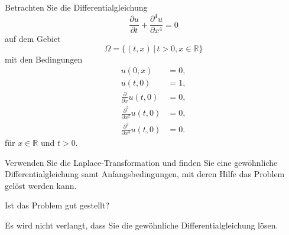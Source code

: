 Betrachten Sie die Differentialgleichung
\begin{equation}
\frac{\partial u}{\partial t}
+
\frac{\partial^4 u}{\partial x^4}
=
0
\end{equation}
auf dem Gebiet
\[
\Omega = \{ (t,x)\,|\, t>0, x\in\mathbb R\}
\]
mit den Bedingungen
\begin{align*}
u(0,x) &= 0,\\
u(t,0) &= 1,\\
\frac{\partial}{\partial x}u(t,0) &=0,\\
\frac{\partial^2}{\partial x^2}u(t,0) &=0,\\
\frac{\partial^3}{\partial x^3}u(t,0) &=0.
\end{align*}
für $x\in\mathbb R$ und $t > 0$.
\begin{teilaufgaben}
\item
Verwenden Sie die Laplace-Transformation und finden Sie eine gewöhnliche
Differentialgleichung samt Anfangsbedingungen, mit deren Hilfe das
Problem gelöst werden kann.
\item
Ist das Problem gut gestellt?
\end{teilaufgaben}

\begin{hinweis}
Es wird nicht verlangt, dass Sie die gewöhnliche Differentialgleichung lösen.
\end{hinweis}


